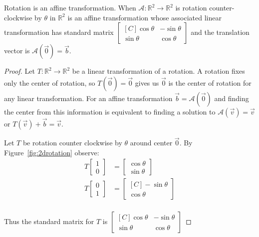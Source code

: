 \begin{proposition} Rotation is an affine transformation. When $\mathcal{A}:\mathbb{R}^2 \to \mathbb{R}^2$ is rotation counter-clockwise by $\theta$ in $\mathbb{R}^2$ is an affine transformation whose associated linear transformation has standard matrix   
$\begin{bmatrix*}[C]
\cos \theta & -\sin \theta\\
\sin \theta & \cos \theta
\end{bmatrix*}$
and the translation vector is $\mathcal{A}(\vec{0})=\vec{b}$.
\end{proposition}
\begin{proof}
Let $T:\mathbb{R}^2 \to \mathbb{R}^2$ be a linear transformation of a rotation. A rotation fixes only the center of rotation, so $T(\vec{0})=\vec{0}$ gives us 
$\vec{0}$ is the center of rotation for any linear transformation. For an affine transformation $\vec{b}=\mathcal{A}(\vec{0})$ and finding the center from this
information is equivalent to finding a solution to $\mathcal{A}(\vec{v})=\vec{v}$ or $T(\vec{v})+\vec{b}=\vec{v}$. 

Let $T$ be rotation counter clockwise by $\theta$ around center $\vec{0}$. By Figure~\ref{fig:2drotation} observe:
\begin{align*}
T \begin{bmatrix}1 \\ 0 \end{bmatrix}&=\begin{bmatrix} \cos \theta \\ \sin \theta \end{bmatrix}\\
T \begin{bmatrix}0 \\ 1 \end{bmatrix}&=\begin{bmatrix*}[C] -\sin \theta \\ \cos \theta \end{bmatrix*}\\
\end{align*}

Thus the standard matrix for $T$ is $\begin{bmatrix*}[C] \cos \theta & -\sin \theta \\ \sin \theta & \cos \theta \end{bmatrix*}$ 
\end{proof}
